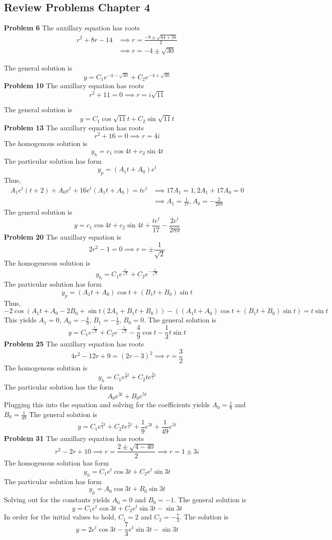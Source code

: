 \subsection*{Review Problems Chapter 4}
\textbf{Problem 6}
The auxillary equation has roots
\begin{align*}
    r^2 + 8 r - 14
    &\implies r = \frac{-8 \pm \sqrt{64 + 56}}{2} \\
    &\implies r = -4 \pm \sqrt{30}
\end{align*}

The general solution is 
\[
    y = C_1e^{-4-\sqrt{30}} + C_2e^{-4+\sqrt{30}}
\]
\textbf{Problem 10}
The auxillary equation has roots 
\[
    r^2 + 11 = 0
    \implies r = i\sqrt{11}
\]

The general solution is 
\[
    y = C_1\cos{\sqrt{11} t} + C_2\sin{\sqrt{11} t}
\]
\textbf{Problem 13}
The auxillary equation has roots 
\[
    r^2 + 16 = 0
    \implies r = 4i
\]
The homogenous solution is
\[
    y_h = c_1\cos 4t + c_2\sin 4t
\]
The particular solution has form 
\[
    y_p = (A_1t + A_0)e^{t}
\]
Thus,
\begin{align*}
     A_1e^t(t+2)+ A_0e^t + 16e^{t}(A_1t + A_0) = te^t 
     &\implies 17A_1 = 1, 2A_1 + 17A_0 = 0 \\  
     &\implies A_1 = \frac{1}{17}, A_0 = -\frac{2}{289}  
\end{align*}
The general solution is 
\[
    y = c_1\cos 4t + c_2\sin 4t + \frac{te^t}{17} - \frac{2e^t}{289}  
\]
\textbf{Problem 20}
The auxillary equation is 
\[
    2r^2 - 1 = 0
    \implies r = \pm \frac{1}{\sqrt{2}}
\]
The homogeneous solution is 
\[
    y_h = C_1e^{\frac{t}{\sqrt{2}}} + C_2e^{-\frac{t}{\sqrt{2}}}
\]
The particular solution has form
\[
    y_p = (A_1t + A_0)\cos t + (B_1t + B_0)\sin t
\]
Thus, 
\[
    -2\cos (A_1t + A_0 -2B_0 + \sin t (2A_1 + B_1t + B_0))
    - ((A_1t + A_0)\cos t + (B_1t + B_0)\sin t)
    = t\sin t
\]
This yields $A_1 = 0$, $A_0 = -\frac{4}{9}$, $B_1 = -\frac{1}{3}$, $B_0 = 0$.
The general solution is
\[
    y = C_1e^{\frac{t}{\sqrt{2}}} + C_2e^{-\frac{t}{\sqrt{2}}} 
    -\frac{4}{9}\cos t - \frac{1}{3} t\sin t
\]
\textbf{Problem 25}
The auxillary equation has roots
\[
    4r^2-12r+9 = (2r-3)^2 
    \implies r = \frac{3}{2}
\]
The homogenous solution is 
\[
    y_h = C_1e^{\frac{3}{2}t} + C_2te^{\frac{3}{2}t}
\]
The particular solution has the form 
\[
    A_0e^{3t} + B_0e^{5t}
\]
Plugging this into the equation and solving for the coefficients yields
$A_0 = \frac{1}{9}$ and $B_0 = \frac{1}{49}$
The general solution is 
\[
    y = C_1e^{\frac{3}{2}t} + C_2te^{\frac{3}{2}t} + \frac{1}{9}e^{3t} + \frac{1}{49}e^{5t}
\]
\textbf{Problem 31}
The auxillary equation has roots 
\[
    r^2-2r+10 
    \implies r = \frac{2 \pm \sqrt{4-40}}{2}
    \implies r = 1 \pm 3i
\]
The homogenous solution has form 
\[
    y_h = C_1e^t\cos 3t + C_2e^t\sin 3t
\]
The particular solution has form 
\[
    y_p = A_0\cos 3t + B_0\sin 3t
\]
Solving out for the constants yields $A_0 = 0$ and $B_0 = -1$.
The general solution is 
\[
    y = C_1e^t\cos 3t + C_2e^t\sin 3t - \sin 3t
\]
In order for the initial values to hold, $C_1 = 2$ and $C_2 = -\frac{7}{3}$.
The solution is 
\[
    y = 2e^t\cos 3t - \frac{7}{3} e^t\sin 3t - \sin 3t
\]